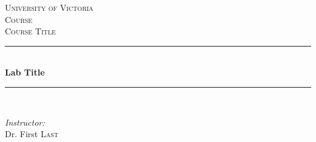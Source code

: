 \documentclass[12pt]{article}
\newcommand{\HRule}{\rule{\linewidth}{0.5mm}}
\begin{document}

\begin{titlepage}
\center %
 

\textsc{\LARGE University of Victoria}\\[1cm] %
\textsc{\Large Course}\\[0.5cm] %
\textsc{\large Course Title}\\[0.5cm] %


\HRule \\[0.4cm]
{ \huge \bfseries Lab Title}\\[0.2cm] %
\HRule \\[1 cm]
 
\begin{center}\large
\emph{Instructor:}	\\
Dr. First \textsc{Last}
\vspace{12 pt}
\end{center}




\end{titlepage}
\end{document}
